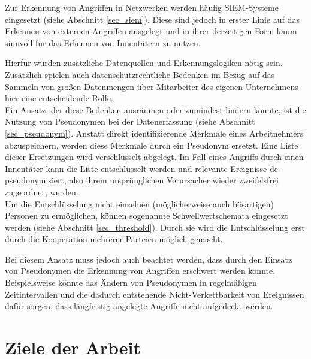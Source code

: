 \documentclass[
    fontsize=12pt,
    headings=small,
    parskip=half,           %
    bibliography=totoc,
    numbers=noenddot,       %
    open=any,               %
    ]{scrreprt}
\begin{document}
Zur Erkennung von Angriffen in Netzwerken werden häufig SIEM-Systeme eingesetzt (siehe Abschnitt \ref{sec_siem}). Diese sind jedoch in erster Linie auf das Erkennen von externen Angriffen ausgelegt und in ihrer derzeitigen Form kaum sinnvoll für das Erkennen von Innentätern zu nutzen. 

Hierfür würden zusätzliche Datenquellen und Erkennungslogiken nötig sein. Zusätzlich spielen auch  datenschutzrechtliche Bedenken im Bezug auf das Sammeln von großen Datenmengen über Mitarbeiter des eigenen Unternehmens hier eine entscheidende Rolle. \\
Ein Ansatz, der diese Bedenken ausräumen oder zumindest lindern könnte, ist die Nutzung von Pseudonymen bei der Datenerfassung (siehe Abschnitt \ref{sec_pseudonym}). Anstatt direkt identifizierende Merkmale eines Arbeitnehmers abzuspeichern, werden diese Merkmale durch ein Pseudonym ersetzt. Eine Liste dieser Ersetzungen wird verschlüsselt abgelegt. Im Fall eines Angriffs durch einen Innentäter kann die Liste entschlüsselt werden und relevante Ereignisse de-pseudonymisiert, also ihrem ursprünglichen Verursacher wieder zweifelsfrei zugeordnet, werden.\\
Um die Entschlüsselung nicht einzelnen (möglicherweise auch bösartigen) Personen zu ermöglichen, können sogenannte Schwellwertschemata eingesetzt werden (siehe Abschnitt \ref{sec_threshold}). Durch sie wird die Entschlüsselung erst durch die Kooperation mehrerer Parteien möglich gemacht.

Bei diesem Ansatz muss jedoch auch beachtet werden, dass durch den Einsatz von Pseudonymen die Erkennung von Angriffen erschwert werden könnte. Beispielsweise könnte das Ändern von Pseudonymen in regelmäßigen Zeitintervallen und die dadurch entstehende Nicht-Verkettbarkeit von Ereignissen dafür sorgen, dass längfristig angelegte Angriffe nicht aufgedeckt werden.

\section{Ziele der Arbeit}




\end{document}

